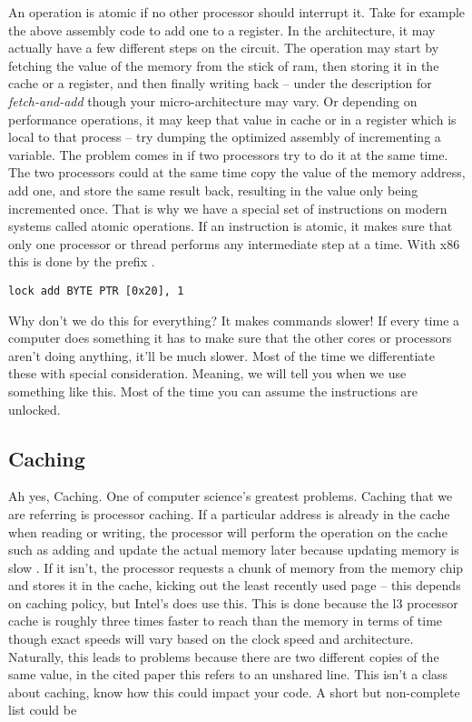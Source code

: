 An operation is atomic if no other processor should interrupt it. Take for example the above assembly code to add one to a register.
In the architecture, it may actually have a few different steps on the circuit.
The operation may start by fetching the value of the memory from the stick of ram, then storing it in the cache or a register, and then finally writing back \cite{schweizer2015evaluating} -- under the description for \textit{fetch-and-add} though your micro-architecture may vary.
Or depending on performance operations, it may keep that value in cache or in a register which is local to that process -- try dumping the  optimized assembly of incrementing a variable.
The problem comes in if two processors try to do it at the same time.
The two processors could at the same time copy the value of the memory address, add one, and store the same result back, resulting in the value only being incremented once.
That is why we have a special set of instructions on modern systems called atomic operations.
If an instruction is atomic, it makes sure that only one processor or thread performs any intermediate step at a time.
With x86 this is done by the  prefix \cite[p. 1120]{guide2011intel}.

\begin{lstlisting}
lock add BYTE PTR [0x20], 1
\end{lstlisting}

Why don't we do this for everything?
It makes commands slower! If every time a computer does something it has to make sure that the other cores or processors aren't doing anything, it'll be much slower.
Most of the time we differentiate these with special consideration.
Meaning, we will tell you when we use something like this.
Most of the time you can assume the instructions are unlocked.

\subsection{Caching}

Ah yes, Caching.
One of computer science's greatest problems.
Caching that we are referring is processor caching.
If a particular address is already in the cache when reading or writing, the processor will perform the operation on the cache such as adding and update the actual memory later because updating memory is slow \cite[Section 3.4]{intel2015improving}.
If it isn't, the processor requests a chunk of memory from the memory chip and stores it in the cache, kicking out the least recently used page -- this depends on caching policy, but Intel's does use this.
This is done because the l3 processor cache is roughly three times faster to reach than the memory in terms of time \cite[p. 22]{levinthal2009performance} though exact speeds will vary based on the clock speed and architecture.
Naturally, this leads to problems because there are two different copies of the same value, in the cited paper this refers to an unshared line.
This isn't a class about caching, know how this could impact your code.
A short but non-complete list could be

